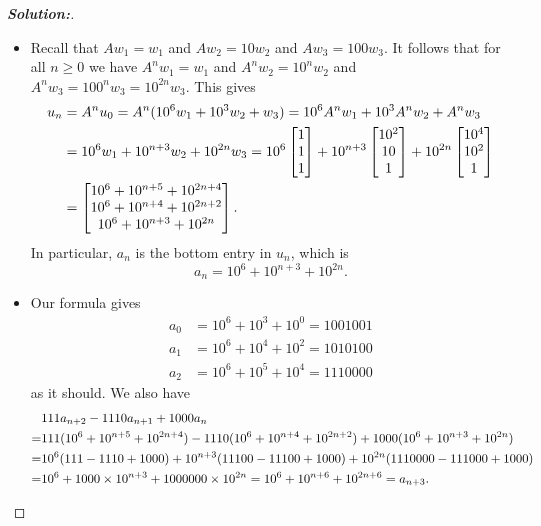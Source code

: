 \documentclass[a4paper]{amsart}
\theoremstyle{definition}
\newenvironment{solution}{\begin{proof}[\textbf{Solution:}] \vphantom{u}}{\end{proof}}
\begin{document}
\begin{solution}
\begin{itemize}
  \item[(d)] Recall that $Aw_1=w_1$ and $Aw_2=10w_2$ and
   $Aw_3=100w_3$.  It follows that for all $n\geq 0$ we have
   $A^nw_1=w_1$ and $A^nw_2=10^nw_2$ and
   $A^nw_3=100^nw_3=10^{2n}w_3$.  This gives
   \begin{align*}
    u_n &= A^nu_0 
         = A^n(10^6 w_1 + 10^3 w_2 + w_3) 
         = 10^6 A^nw_1 + 10^3 A^nw_2 + A^nw_3 \\
        &= 10^6w_1 + 10^{n+3}w_2 + 10^{2n}w_3 
         = 10^6     \left[\begin{matrix} 1    \\ 1    \\ 1 \end{matrix}\right] + 
           10^{n+3} \left[\begin{matrix} 10^2 \\ 10   \\ 1 \end{matrix}\right] + 
           10^{2n}  \left[\begin{matrix} 10^4 \\ 10^2 \\ 1 \end{matrix}\right] \\
        &= \left[\begin{matrix} 10^6 + 10^{n+5} + 10^{2n+4} \\
                10^6 + 10^{n+4} + 10^{2n+2} \\
                10^6 + 10^{n+3} + 10^{2n} \end{matrix}\right].
   \end{align*}
   In particular, $a_n$ is the bottom entry in $u_n$, which is
   \[ a_n = 10^6 + 10^{n+3} + 10^{2n}. \]
  \item[(e)] Our formula gives
   \begin{align*}
    a_0 &= 10^6 + 10^{3} + 10^{0} = 1001001 \\
    a_1 &= 10^6 + 10^{4} + 10^{2} = 1010100 \\
    a_2 &= 10^6 + 10^{5} + 10^{4} = 1110000 
   \end{align*}
   as it should.  We also have
   \begin{align*}
      & 111a_{n+2}-1110 a_{n+1}+1000a_n \\
     =& 111(10^6 + 10^{n+5} + 10^{2n+4}) - 
        1110(10^6 + 10^{n+4} + 10^{2n+2}) +
        1000(10^6 + 10^{n+3} + 10^{2n}) \\
     =& 10^6(111-1110+1000) + 
        10^{n+3}(11100-11100+1000) +
        10^{2n}(1110000-111000+1000) \\
     =& 10^6 + 1000\times 10^{n+3} + 1000000\times 10^{2n} 
     =  10^6 + 10^{n+6} + 10^{2n+6} = a_{n+3}.
   \end{align*}
 \end{itemize}
\end{solution}
\end{document}
